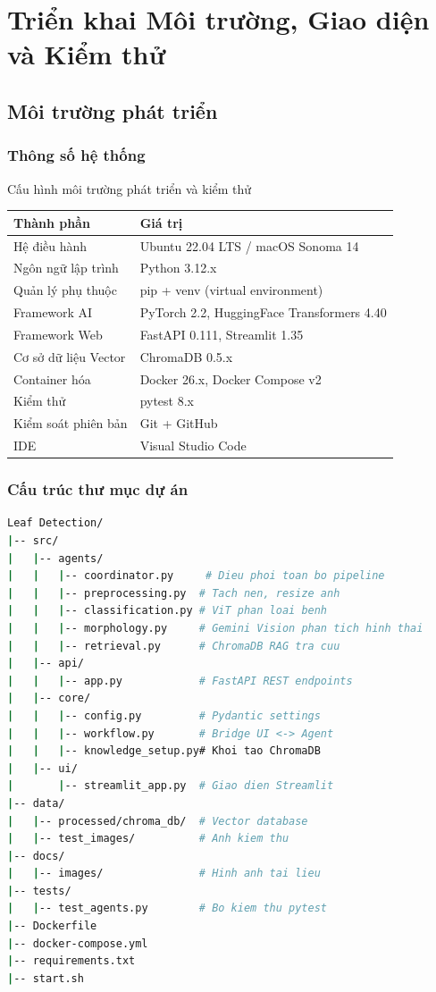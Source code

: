 \chapter{Triển khai Môi trường, Giao diện và Kiểm thử}

\section{Môi trường phát triển}

\subsection{Thông số hệ thống}
\begin{table}[H]{{Cấu hình môi trường phát triển và kiểm thử}}
\centering
\begin{tabular}{ll}
\toprule
\textbf{Thành phần} & \textbf{Giá trị} \\
\midrule
Hệ điều hành & Ubuntu 22.04 LTS / macOS Sonoma 14 \\
Ngôn ngữ lập trình & Python 3.12.x \\
Quản lý phụ thuộc & pip + venv (virtual environment) \\
Framework AI & PyTorch 2.2, HuggingFace Transformers 4.40 \\
Framework Web & FastAPI 0.111, Streamlit 1.35 \\
Cơ sở dữ liệu Vector & ChromaDB 0.5.x \\
Container hóa & Docker 26.x, Docker Compose v2 \\
Kiểm thử & pytest 8.x \\
Kiểm soát phiên bản & Git + GitHub \\
IDE & Visual Studio Code \\
\bottomrule
\end{tabular}
\end{table}
\newpage
\subsection{Cấu trúc thư mục dự án}
\begin{lstlisting}[language=bash, caption={Cấu trúc thư mục dự án Rice Disease Detection AI}, label={lst:dir_structure}, basicstyle=\ttfamily\small, numbers=none]
Leaf Detection/
|-- src/
|   |-- agents/
|   |   |-- coordinator.py     # Dieu phoi toan bo pipeline
|   |   |-- preprocessing.py  # Tach nen, resize anh
|   |   |-- classification.py # ViT phan loai benh
|   |   |-- morphology.py     # Gemini Vision phan tich hinh thai
|   |   |-- retrieval.py      # ChromaDB RAG tra cuu
|   |-- api/
|   |   |-- app.py            # FastAPI REST endpoints
|   |-- core/
|   |   |-- config.py         # Pydantic settings
|   |   |-- workflow.py       # Bridge UI <-> Agent
|   |   |-- knowledge_setup.py# Khoi tao ChromaDB
|   |-- ui/
|       |-- streamlit_app.py  # Giao dien Streamlit
|-- data/
|   |-- processed/chroma_db/  # Vector database
|   |-- test_images/          # Anh kiem thu
|-- docs/
|   |-- images/               # Hinh anh tai lieu
|-- tests/
|   |-- test_agents.py        # Bo kiem thu pytest
|-- Dockerfile
|-- docker-compose.yml
|-- requirements.txt
|-- start.sh
\end{lstlisting}

